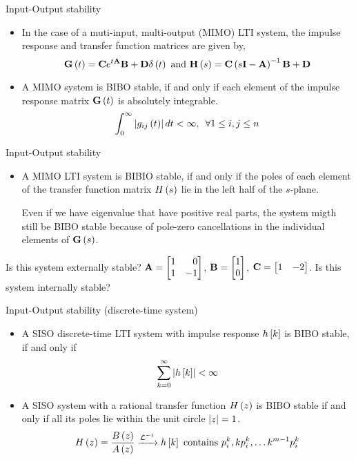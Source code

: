 \documentclass[aspectratio=169]{beamer}
\def\mf{\ensuremath\mathbf}
\def\lp{\ensuremath\left(}
\def\rp{\ensuremath\right)}
\def\lv{\ensuremath\left\lvert}
\def\rv{\ensuremath\right\rvert}
\def\ls{\ensuremath\left[}
\def\rs{\ensuremath\right]}
\def\bmx{\ensuremath\begin{bmatrix*}[r]}
\def\emx{\ensuremath\end{bmatrix*}}
\newcommand{\ct}[1]{\lp #1\rp}
\newcommand{\dt}[1]{\ls #1\rs}
\begin{document}
\begin{frame}[t]{Input-Output stability}
\begin{itemize}
    \item In the case of a muti-input, multi-output (MIMO) LTI system, the impulse response and transfer function matrices are given by,
    \[ \mf{G}\ct{t} = \mf{C}e^{t\mf{A}}\mf{B} + \mf{D}\delta\ct{t} \text{ and } \mf{H}\ct{s} = \mf{C}\ct{s\mf{I} - \mf{A}}^{-1}\mf{B} + \mf{D} \]

    \item A MIMO system is BIBO stable, if and only if each element of the impulse response matrix $\mf{G}\ct{t}$ is absolutely integrable.
    \[ \int_{0}^\infty \lv g_{ij}\ct{t}\rv dt < \infty , \,\,\, \forall 1 \leq i, j \leq n \]
\end{itemize}
\end{frame} 


\begin{frame}[t]{Input-Output stability}
\begin{itemize}
    \item A MIMO LTI system is BIBIO stable, if and only if the poles of each element of the transfer function matrix $H\ct{s}$ lie in the left half of the $s$-plane.

    Even if we have eigenvalue that have positive real parts, the system migth still be BIBO stable because of pole-zero cancellations in the individual elements of $\mf{G}\ct{s}$.
\end{itemize}

Is this system externally stable? $\mf{A} = \bmx 1 & 0\\ 1 & -1\emx$, $\mf{B} = \bmx 1 \\ 0\emx$, $\mf{C} = \bmx 1 & -2\emx$. Is this system internally stable?
\end{frame} 


\begin{frame}{Input-Output stability (discrete-time system)}
\begin{itemize}
    \item A SISO discrete-time LTI system with impulse response $h\dt{k}$ is BIBO stable, if and only if
    \[ \sum_{k=0}^{\infty} \lv h\dt{k}\rv < \infty \]

    \item A SISO system with a rational transfer function $H\ct{z}$ is BIBO stable if and only if all its poles lie within the unit circle $\lv z\rv = 1$.
    \[ H\ct{z} = \frac{B\ct{z}}{A\ct{z}} \xrightarrow{\mathcal{L}^{-1}} h\dt{k} \text{ contains } p_i^k, kp_i^k, \ldots k^{m-1}p_i^k \]
\end{itemize}
\end{frame} 
\end{document}
